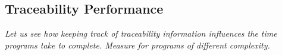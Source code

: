 \subsection{Traceability Performance}
{\it Let us see how keeping track of traceability information influences the time programs take to complete. Measure for programs of different complexity.}



